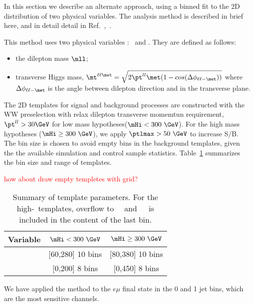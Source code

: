 In this section we describe an alternate approach,
using a binned fit to the 2D distribution of two physical variables.
The analysis method is described in brief here,
and in detail detail in Ref.~\cite{2DNote},~\cite{hcp2012Note}.

This method uses two physical variables : \mll~and \mt.
They are defined as follows:

\begin{itemize}
\item the dilepton mass $\mll$;
\item transverse Higgs mass,
$\mt^{\ell\ell\met} = \sqrt{2\pt^{ll}\met(1-cos(\Delta\phi_{\ell\ell-\met}))}$ where
$\Delta\phi_{\ell\ell-\met}$ is the angle between dilepton
direction and \met in the transverse plane.
\end{itemize}

The 2D templates for signal and background processes are constructed 
with the WW preselection with relax dilepton transverse momemtun requirement, 
$\pt^{ll}>30\GeV$ for low mass hypotheses($\mHi<300~\GeV$). For the high mass hypotheses ($\mHi\ge300~\GeV$),
we apply $\ptlmax > 50~\GeV$ to increase S/B. The bin size is chosen to avoid empty 
bins in the background templates, given the the available simulation and control sample statistics.  
Table~\ref{tab:binning_range} summarizes the bin size and range of templates. 


\fixme \textcolor{red}{how about draw empty templetes with grid?} 
\vspace{25pt}
\begin{table}[!htb]
\centering
\begin{tabular}{c | c | c }
\hline \hline
     Variable  & $\mHi< 300~\GeV$  & $\mHi\ge 300~\GeV$    \\
	\hline \hline
	\mt       & [60,280] 10 bins  & [80,380] 10 bins      \\
	\mll      & [0,200] 8 bins    & [0,450] 8 bins        \\
	\hline
	\end{tabular}
	\label{tab:binning_range}
	\caption{Summary of template parameters. For the high-\mHi~templates, 
			 overflow to ~\GeV~and~~\GeV~is included
		  	 in the content of the last bin.}
\end{table}

We have applied the method to the $e\mu$ final state in the 0 and 1 jet bins, 
which are the most sensitive channels.  

